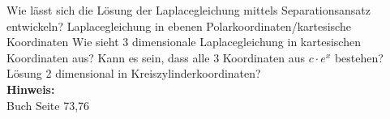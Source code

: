 \begin{question}[section=3,subsection=32,name={Laplacelösung mittels Seperationsansatz},difficulty=8,type=mdl,mode=exm,tags={}]
	Wie lässt sich die Lösung der Laplacegleichung mittels Separationsansatz entwickeln? Laplacegleichung in ebenen Polarkoordinaten/kartesische Koordinaten Wie sieht 3 dimensionale Laplacegleichung in kartesischen Koordinaten aus? Kann es sein, dass alle 3 Koordinaten aus $c \cdot e^{x} $ bestehen?
	Lösung 2 dimensional in Kreiszylinderkoordinaten?
	\\ \textbf{Hinweis:}\\
	Buch Seite 73,76
\end{question}
\begin{solution}
	
\end{solution}